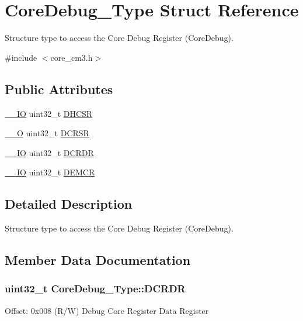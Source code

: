 \hypertarget{struct_core_debug___type}{}\section{Core\+Debug\+\_\+\+Type Struct Reference}
\label{struct_core_debug___type}


Structure type to access the Core Debug Register (Core\+Debug).  




{\ttfamily \#include $<$core\+\_\+cm3.\+h$>$}

\subsection*{Public Attributes}
\begin{DoxyCompactItemize}
\item 
\hyperlink{core__sc300_8h_aec43007d9998a0a0e01faede4133d6be}{\+\_\+\+\_\+\+IO} uint32\+\_\+t \hyperlink{struct_core_debug___type_a25c14c022c73a725a1736e903431095d}{D\+H\+C\+SR}
\item 
\hyperlink{core__sc300_8h_a7e25d9380f9ef903923964322e71f2f6}{\+\_\+\+\_\+O} uint32\+\_\+t \hyperlink{struct_core_debug___type_afefa84bce7497652353a1b76d405d983}{D\+C\+R\+SR}
\item 
\hyperlink{core__sc300_8h_aec43007d9998a0a0e01faede4133d6be}{\+\_\+\+\_\+\+IO} uint32\+\_\+t \hyperlink{struct_core_debug___type_ab8f4bb076402b61f7be6308075a789c9}{D\+C\+R\+DR}
\item 
\hyperlink{core__sc300_8h_aec43007d9998a0a0e01faede4133d6be}{\+\_\+\+\_\+\+IO} uint32\+\_\+t \hyperlink{struct_core_debug___type_a5cdd51dbe3ebb7041880714430edd52d}{D\+E\+M\+CR}
\end{DoxyCompactItemize}


\subsection{Detailed Description}
Structure type to access the Core Debug Register (Core\+Debug). 

\subsection{Member Data Documentation}
\subsubsection[{\texorpdfstring{D\+C\+R\+DR}{DCRDR}}]{ uint32\+\_\+t Core\+Debug\+\_\+\+Type\+::\+D\+C\+R\+DR}\hypertarget{struct_core_debug___type_ab8f4bb076402b61f7be6308075a789c9}{}\label{struct_core_debug___type_ab8f4bb076402b61f7be6308075a789c9}
Offset\+: 0x008 (R/W) Debug Core Register Data Register 
